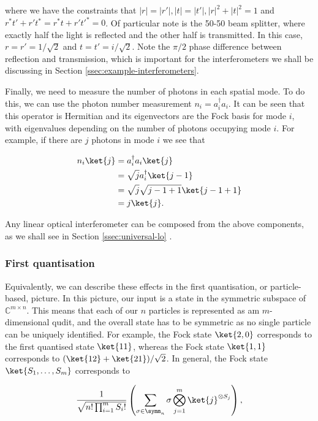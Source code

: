 \noindent where we have the constraints that $|r|=|r'|, |t|=|t'|, |r|^2+|t|^2=1$ and $r^*t' + r't^* = r^*t+r't'^*=0$. Of particular note is the 50-50 beam splitter, where exactly half the light is reflected and the other half is transmitted. In this case, $r=r'=1/\sqrt{2}$ and $t=t'=i/\sqrt{2}$. Note the $\pi/2$ phase difference between reflection and transmission, which is important for the interferometers we shall be discussing in Section \ref{ssec:example-interferometers}.

Finally, we need to measure the number of photons in each spatial mode. To do this, we can use the photon number measurement $n_i = a_i^\dagger a_i$. It can be seen that this operator is Hermitian and its eigenvectors are the Fock basis for mode $i$, with eigenvalues depending on the number of photons occupying mode $i$. For example, if there are $j$ photons in mode $i$ we see that

\begin{align}
n_i\ket{j} &= a_i^\dagger a_i\ket{j}\\
&= \sqrt{j}a_i^\dagger\ket{j-1}\\
&= \sqrt{j}\sqrt{j-1+1}\ket{j-1+1}\\
&= j\ket{j}.
\end{align}

Any linear optical interferometer can be composed from the above components, as we shall see in Section \ref{ssec:universal-lo} \cite{hurwitz1897, reck1994, clements2016}.

\subsubsection{First quantisation}

Equivalently, we can describe these effects in the first quantisation, or particle-based, picture. In this picture, our input is a state in the symmetric subspace of $\mathbb{C}^{m\times n}$. This means that each of our $n$ particles is represented as am $m$-dimensional qudit, and the overall state has to be symmetric as no single particle can be uniquely identified. For example, the Fock state $\ket{2,0}$ corresponds to the first quantised state $\ket{11}$, whereas the Fock state $\ket{1,1}$ corresponds to $(\ket{12} + \ket{21})/\sqrt{2}$. In general, the Fock state $\ket{S_1,\dots,S_m}$ corresponds to

\begin{equation}
\frac{1}{\sqrt{n!\prod_{i=1}^mS_i!}}\left(\sum_{\sigma\in\symm_n}\sigma\bigotimes_{j=1}^m\ket{j}^{\otimes S_j}\right),
\end{equation}

